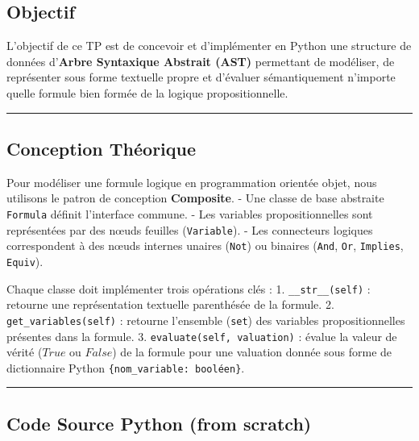 \documentclass[11pt,a4paper]{article}
\begin{document}
\hypertarget{objectif}{%
\subsection{Objectif}\label{objectif}}

L'objectif de ce TP est de concevoir et d'implémenter en Python une
structure de données d'\textbf{Arbre Syntaxique Abstrait (AST)}
permettant de modéliser, de représenter sous forme textuelle propre et
d'évaluer sémantiquement n'importe quelle formule bien formée de la
logique propositionnelle.

\begin{center}\rule{0.5\linewidth}{0.5pt}\end{center}

\hypertarget{conception-thuxe9orique}{%
\subsection{Conception Théorique}\label{conception-thuxe9orique}}

Pour modéliser une formule logique en programmation orientée objet, nous
utilisons le patron de conception \textbf{Composite}. - Une classe de
base abstraite \texttt{Formula} définit l'interface commune. - Les
variables propositionnelles sont représentées par des nœuds feuilles
(\texttt{Variable}). - Les connecteurs logiques correspondent à des
nœuds internes unaires (\texttt{Not}) ou binaires (\texttt{And},
\texttt{Or}, \texttt{Implies}, \texttt{Equiv}).

Chaque classe doit implémenter trois opérations clés : 1.
\texttt{\_\_str\_\_(self)} : retourne une représentation textuelle
parenthésée de la formule. 2. \texttt{get\_variables(self)} : retourne
l'ensemble (\texttt{set}) des variables propositionnelles présentes dans
la formule. 3. \texttt{evaluate(self,\ valuation)} : évalue la valeur de
vérité (\(True\) ou \(False\)) de la formule pour une valuation donnée
sous forme de dictionnaire Python \texttt{\{nom\_variable:\ booléen\}}.

\begin{center}\rule{0.5\linewidth}{0.5pt}\end{center}

\hypertarget{code-source-python-from-scratch}{%
\subsection{Code Source Python (from
scratch)}\label{code-source-python-from-scratch}}
\end{document}
